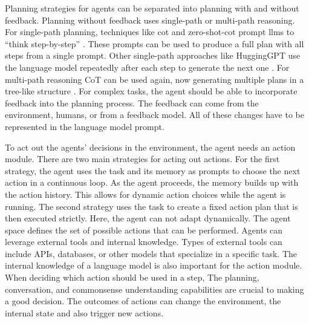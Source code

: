 \documentclass[../main.tex]{subfiles}
\begin{document}
Planning strategies for agents can be separated into planning with and without feedback.
Planning without feedback uses single-path or multi-path reasoning.
For single-path planning, techniques like \gls{cot} and zero-shot-\gls{cot} prompt \glspl{llm}
to ``think step-by-step'' \cite{Wei2022}.
These prompts can be used to produce a full plan with all steps from a single prompt.
Other single-path approaches like HuggingGPT
use the language model repeatedly after each step
to generate the next one \cite{Shen2023}.
For multi-path reasoning CoT can be used again, now generating multiple plans
in a tree-like structure \cite{Yao2023}.
For complex tasks, the agent should be able to incorporate feedback into
the planning process.
The feedback can come from the environment, humans, or from a feedback model.
All of these changes have to be represented in the language model prompt.

To act out the agents' decisions in the environment, the agent needs an
action module.
There are two main strategies for acting out actions.
For the first strategy,
the agent uses the task and its memory as prompts
to choose the next action in a continuous loop.
As the agent proceeds, the memory builds up with the action history.
This allows for dynamic action choices while the agent is running.
The second strategy uses the task to create a fixed action plan
that is then executed strictly.
Here, the agent can not adapt dynamically.
The agent space defines the set of possible actions that can be performed.
Agents can leverage external tools and internal knowledge.
Types of external tools can include APIs, databases, or other models
that specialize in a specific task.
The internal knowledge of a language model is also important for the action module.
When deciding which action should be used in a step,
The planning, conversation, and commonsense understanding capabilities
are crucial to making a good decision.
The outcomes of actions can change the environment, the internal state and
also trigger new actions.
\end{document}
